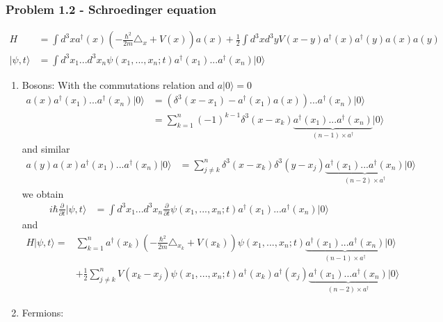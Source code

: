 \documentclass[10pt,a4paper]{article}
\theoremstyle{definition}
\begin{document}
\subsubsection{Problem 1.2 - Schroedinger equation}
\begin{align}
    H&=\int d^3x a^\dagger(x)\left(-\frac{\hbar^2}{2m}\triangle_x+V(x)\right)a(x)+\frac{1}{2}\int d^3xd^3yV(x-y)a^\dagger(x)a^\dagger(y)a(x)a(y)\\
    |\psi,t\rangle&=\int d^3x_1...d^3x_n\psi(x_1,...,x_n;t)a^\dagger(x_1)...a^\dagger(x_n)|0\rangle
\end{align}
\begin{enumerate}
    \item Bosons:
    With the commutations relation and $a|0\rangle=0$
    \begin{align}
        a(x)a^\dagger(x_1)...a^\dagger(x_n)|0\rangle
        &=\left(\delta^3(x-x_1)-a^\dagger(x_1)a(x)\right)...a^\dagger(x_n)|0\rangle\\
        &=\sum_{k=1}^n(-1)^{k-1} \delta^3(x-x_k)\underbrace{a^\dagger(x_1)...a^\dagger(x_n)}_{(n-1) \times a^\dagger}|0\rangle
    \end{align}
    and similar
    \begin{align}
        a(y)a(x)a^\dagger(x_1)...a^\dagger(x_n)|0\rangle
        &=\sum_{j\neq k}^n \delta^3(x-x_k)\delta^3(y-x_j)\underbrace{a^\dagger(x_1)...a^\dagger(x_n)}_{(n-2) \times a^\dagger}|0\rangle
    \end{align}
    we obtain
	\begin{align}
		i\hbar\frac{\partial}{\partial t}|\psi,t\rangle
		&=\int d^3x_1...d^3x_n\frac{\partial}{\partial t}\psi(x_1,...,x_n;t)a^\dagger(x_1)...a^\dagger(x_n)|0\rangle 
	\end{align}
    and
    \begin{align}
        H|\psi,t\rangle=&\sum_{k=1}^na^\dagger(x_k)\left(-\frac{\hbar^2}{2m}\triangle_{x_k}+V(x_k)\right)\psi(x_1,...,x_n;t)\underbrace{a^\dagger(x_1)...a^\dagger(x_n)}_{(n-1) \times a^\dagger}|0\rangle\\
        &+\frac{1}{2}\sum_{j\neq k}^nV(x_k-x_j)\psi(x_1,...,x_n;t)a^\dagger(x_k)a^\dagger(x_j)\underbrace{a^\dagger(x_1)...a^\dagger(x_n)}_{(n-2) \times a^\dagger}|0\rangle
    \end{align}
    \item Fermions:
\end{enumerate}
\end{document}
